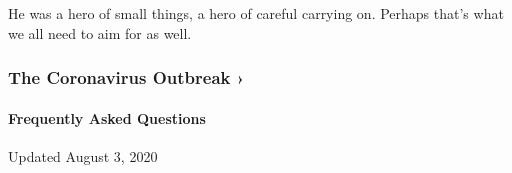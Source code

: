 He was a hero of small things, a hero of careful carrying on. Perhaps
that's what we all need to aim for as well.

\href{https://www.nytimes.com/news-event/coronavirus?action=click\&pgtype=Article\&state=default\&region=MAIN_CONTENT_3\&context=storylines_faq}{}

\hypertarget{the-coronavirus-outbreak-}{%
\subsubsection{The Coronavirus Outbreak
›}\label{the-coronavirus-outbreak-}}

\hypertarget{frequently-asked-questions}{%
\paragraph{Frequently Asked
Questions}\label{frequently-asked-questions}}

Updated August 3, 2020


